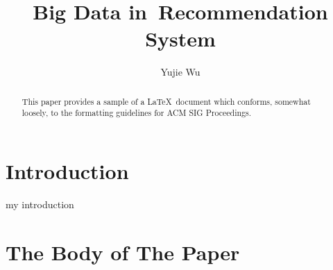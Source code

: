 \documentclass[sigconf]{acmart}
\begin{document}
\title{Big Data in Recommendation System}


\author{Yujie Wu}


\renewcommand{\shortauthors}{Y. Wu}


\begin{abstract}
This paper provides a sample of a \LaTeX\ document which conforms,
somewhat loosely, to the formatting guidelines for
ACM SIG Proceedings.
\end{abstract}



\maketitle

\section{Introduction}

my introduction\cite{Abril07}

\section{The Body of The Paper}



 
\end{document}
